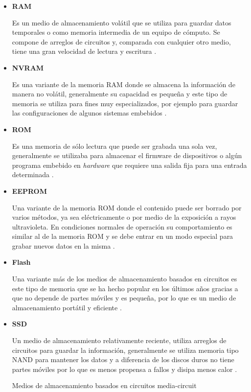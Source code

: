 \begin{itemize}

  \item \textbf{RAM}

Es un medio de almacenamiento vol\'{a}til que se utiliza para guardar datos temporales o como memoria intermedia de un equipo de c\'{o}mputo. Se compone de arreglos de circuitos y, comparada con cualquier otro medio, tiene una gran velocidad de lectura y escritura \cite{_rom_????}.

  \item \textbf{NVRAM}

Es una variante de la memoria \textsc{RAM} donde se almacena la informaci\'{o}n de manera no vol\'{a}til, generalmente su capacidad es peque\~{n}a y este tipo de memoria se utiliza para fines muy especializados, por ejemplo para guardar las configuraciones de algunos sistemas embebidos \cite{veenstra_random_1986}.

  \item \textbf{ROM}

Es una memoria de s\'{o}lo lectura que puede ser grabada una sola vez, generalmente se utilizaba para almacenar el firmware de dispositivos o alg\'{u}n programa embebido en \textit{hardware} que requiere una salida fija para una entrada determinada \cite{_rom_????}.

  \item \textbf{EEPROM}

Una variante de la memoria \textsc{ROM} donde el contenido puede ser borrado por varios m\'{e}todos, ya sea el\'{e}ctricamente o por medio de la exposici\'{o}n a rayos ultravioleta. En condiciones normales de operaci\'{o}n su comportamiento es similar al de la memoria \textsc{ROM} y se debe entrar en un modo especial para grabar nuevos datos en la misma \cite{_rom_????-1}.

  \item \textbf{Flash}

Una variante m\'{a}s de los medios de almacenamiento basados en circuitos es este tipo de memoria que se ha hecho popular en los \'{u}ltimos a\~{n}os gracias a que no depende de partes m\'{o}viles y es peque\~{n}a, por lo que es un medio de almacenamiento port\'{a}til y eficiente \cite{_flashmemguide.pdf_????}.

  \item \textbf{SSD}

Un medio de almacenamiento relativamente reciente, utiliza arreglos de circuitos para guardar la informaci\'{o}n, generalmente se utiliza memoria tipo \textsc{NAND} para mantener los datos y a diferencia de los discos duros no tiene partes m\'{o}viles por lo que es menos propensa a fallos y disipa menos calor \cite{_ssd-faq-us.pdf_????}.

\diagramblock
{Medios de almacenamiento basados en circuitos}
{media-circuit}
{
 {
  
 }
}

\end{itemize}

